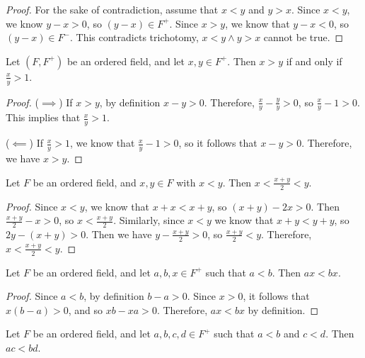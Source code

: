 \begin{proof}
    For the sake of contradiction, assume that $x < y$ and $y > x$. Since $x < y$, we know $y - x > 0$, so $(y - x) \in F^+$. Since $x > y$, we know that $y - x < 0$, so $(y - x) \in F^-$. This contradicts trichotomy, $x < y \land y > x$ cannot be true.
\end{proof}

\begin{prop}\label{greater-than-ratio}
    Let $(F, F^+)$ be an ordered field, and let $x, y \in F^{+}$. Then $x > y$ if and only if $\frac{x}{y} > 1$.
\end{prop}

\begin{proof}\proofbreak
    ($\implies$) If $x > y$, by definition $x - y > 0$. Therefore, $\frac{x}{y} - \frac{y}{y} > 0$, so $\frac{x}{y} - 1 > 0$. This implies that $\frac{x}{y} > 1$.

    ($\impliedby$) If $\frac{x}{y} > 1$, we know that $\frac{x}{y} - 1 > 0$, so it follows that $x - y > 0$. Therefore, we have $x > y$.
\end{proof}

\begin{prop}\label{average-in-between}
    Let $F$ be an ordered field, and $x, y \in F$ with $x < y$. Then $x < \frac{x+y}{2} < y$.
\end{prop}

\begin{proof}
    Since $x < y$, we know that $x + x < x + y$, so $(x + y) - 2x > 0$. Then $\frac{x+y}{2} - x > 0$, so $x < \frac{x+y}{2}$. Similarly, since $x < y$ we know that $x + y < y + y$, so $2y - (x + y) > 0$. Then we have $y - \frac{x + y}{2} > 0$, so $\frac{x + y}{2} < y$. Therefore, $x < \frac{x+y}{2} < y$.
\end{proof}

\begin{prop}\label{multiplicative-inequality-one}
    Let $F$ be an ordered field, and let $a, b, x \in F^+$ such that $a < b$. Then $ax < bx$.
\end{prop}

\begin{proof}
    Since $a < b$, by definition $b - a > 0$. Since $x > 0$, it follows that $x(b-a) > 0$, and so $xb - xa > 0$. Therefore, $ax < bx$ by definition.
\end{proof}

\begin{prop}\label{multiplicative-inequality-two}
    Let $F$ be an ordered field, and let $a, b, c, d \in F^+$ such that $a < b$ and $c < d$. Then $ac < bd$.
\end{prop}

